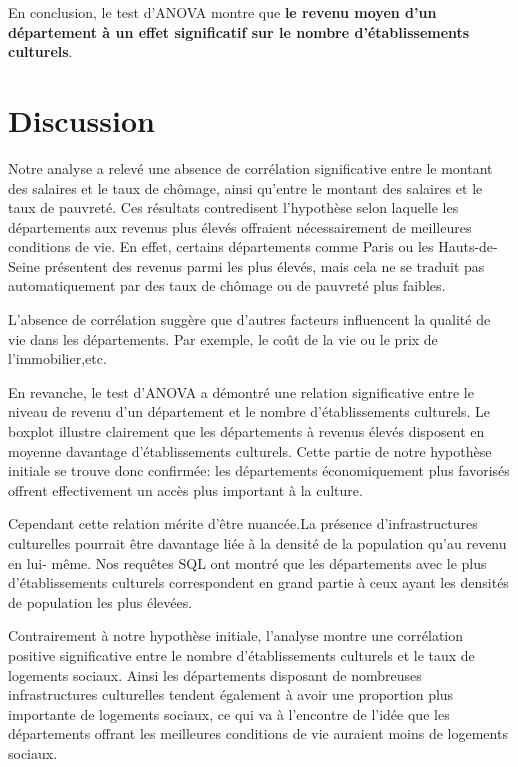 \documentclass[mstat,12pt]{unswthesis}
\begin{document}
En conclusion, le test d'ANOVA montre que \textbf{le revenu moyen d'un
département à un effet significatif sur le nombre d'établissements
culturels}.

\chapter{Discussion}\label{discussion}

Notre analyse a relevé une absence de corrélation significative entre le
montant des salaires et le taux de chômage, ainsi qu'entre le montant
des salaires et le taux de pauvreté. Ces résultats contredisent
l'hypothèse selon laquelle les départements aux revenus plus élevés
offraient nécessairement de meilleures conditions de vie. En effet,
certains départements comme Paris ou les Hauts-de-Seine présentent des
revenus parmi les plus élevés, mais cela ne se traduit pas
automatiquement par des taux de chômage ou de pauvreté plus faibles.

\medskip

L'absence de corrélation suggère que d'autres facteurs influencent la
qualité de vie dans les départements. Par exemple, le coût de la vie ou
le prix de l'immobilier,etc.

\medskip

En revanche, le test d'ANOVA a démontré une relation significative entre
le niveau de revenu d'un département et le nombre d'établissements
culturels. Le boxplot illustre clairement que les départements à revenus
élevés disposent en moyenne davantage d'établissements culturels. Cette
partie de notre hypothèse initiale se trouve donc confirmée: les
départements économiquement plus favorisés offrent effectivement un
accès plus important à la culture.

\medskip

Cependant cette relation mérite d'être nuancée.La présence
d'infrastructures culturelles pourrait être davantage liée à la densité
de la population qu'au revenu en lui- même. Nos requêtes SQL ont montré
que les départements avec le plus d'établissements culturels
correspondent en grand partie à ceux ayant les densités de population
les plus élevées.

\medskip

Contrairement à notre hypothèse initiale, l'analyse montre une
corrélation positive significative entre le nombre d'établissements
culturels et le taux de logements sociaux. Ainsi les départements
disposant de nombreuses infrastructures culturelles tendent également à
avoir une proportion plus importante de logements sociaux, ce qui va à
l'encontre de l'idée que les départements offrant les meilleures
conditions de vie auraient moins de logements sociaux.
\end{document}
